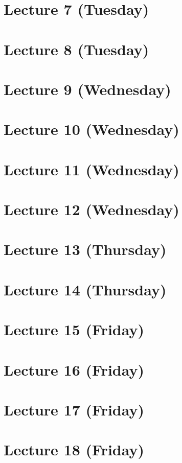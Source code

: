 \documentclass[12pt]{amsart}
\numberwithin{equation}{section}
\theoremstyle{definition}
\numberwithin{figure}{section}
\begin{document}
\section{Lecture 7 (Tuesday)}

\section{Lecture 8 (Tuesday)}

\section{Lecture 9 (Wednesday)}

\section{Lecture 10 (Wednesday)}

\section{Lecture 11 (Wednesday)}

\section{Lecture 12 (Wednesday)}

\section{Lecture 13 (Thursday)}

\section{Lecture 14 (Thursday)}

\section{Lecture 15 (Friday)}

\section{Lecture 16 (Friday)}

\section{Lecture 17 (Friday)}

\section{Lecture 18 (Friday)}
\end{document}
